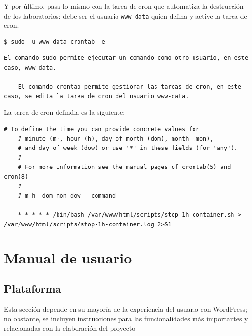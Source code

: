         Y por último, pasa lo mismo con la tarea de cron que automatiza la destrucción de los laboratorios: debe ser el usuario \texttt{www-data} quien defina y active la tarea de cron.
        \\

        \begin{lstlisting}[style=bash_style]
    $ sudo -u www-data crontab -e
        \end{lstlisting}

        \begin{lstlisting}[style=comment_style]
    El comando sudo permite ejecutar un comando como otro usuario, en este caso, www-data.

    El comando crontab permite gestionar las tareas de cron, en este caso, se edita la tarea de cron del usuario www-data.
        \end{lstlisting}

        La tarea de cron defindia es la siguiente:
        \\

        \begin{lstlisting}[style=bash_style, caption={contenido del fichero},captionpos=b, basicstyle=\ttfamily\scriptsize]
    # To define the time you can provide concrete values for
    # minute (m), hour (h), day of month (dom), month (mon),
    # and day of week (dow) or use '*' in these fields (for 'any').
    # 
    # For more information see the manual pages of crontab(5) and cron(8)
    # 
    # m h  dom mon dow   command

    * * * * * /bin/bash /var/www/html/scripts/stop-1h-container.sh > /var/www/html/scripts/stop-1h-container.log 2>&1
        \end{lstlisting}

        \cleardoublepage



\chapter{Manual de usuario}

    \section{Plataforma}

        Esta sección depende en su mayoría de la experiencia del usuario con WordPress; no obstante, se incluyen instrucciones para las funcionalidades más importantes y relacionadas con la elaboración del proyecto.

